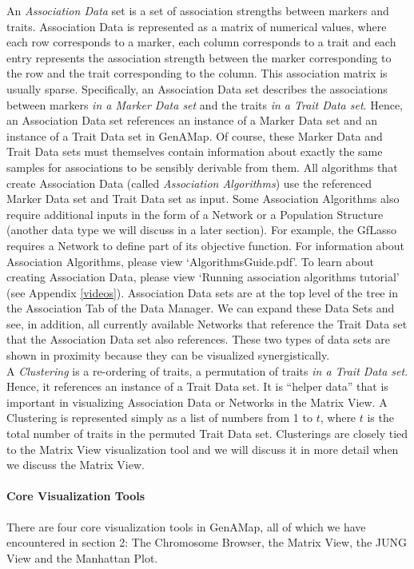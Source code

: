\documentclass{article}
\begin{document}
An {\it Association Data} set is a set of association strengths between markers and traits. Association Data is represented as a matrix of numerical values, where each row corresponds to a marker, each column corresponds to a trait and each entry represents the association strength between the marker corresponding to the row and the trait corresponding to the column. This association matrix is usually sparse. Specifically, an Association Data set describes the associations between markers {\it in a Marker Data set} and the traits {\it in a Trait Data set}. Hence, an Association Data set references an instance of a Marker Data set and an instance of a Trait Data set in GenAMap. Of course, these Marker Data and Trait Data sets must themselves contain information about exactly the same samples for associations to be sensibly derivable from them. All algorithms that create Association Data (called {\it Association Algorithms}) use the referenced Marker Data set and Trait Data set as input. Some Association Algorithms also require additional inputs in the form of a Network or a Population Structure (another data type we will discuss in a later section). For example, the GfLasso requires a Network to define part of its objective function. For information about Association Algorithms, please view `AlgorithmsGuide.pdf'. To learn about creating Association Data, please view `Running association algorithms tutorial' (see Appendix \ref{videos}). Association Data sets are at the top level of the tree in the Association Tab of the Data Manager. We can expand these Data Sets and see, in addition, all currently available Networks that reference the Trait Data set that the Association Data set also references. These two types of data sets are shown in proximity because they can be visualized synergistically.\\

A {\it Clustering} is a re-ordering of traits, a permutation of traits {\it in a Trait Data set}. Hence, it references an instance of a Trait Data set. It is ``helper data'' that is important in visualizing Association Data or Networks in the Matrix View. A Clustering is represented simply as a list of numbers from 1 to $t$, where $t$ is the total number of traits in the permuted Trait Data set.  Clusterings are closely tied to the Matrix View visualization tool and we will discuss it in more detail when we discuss the Matrix View.

\paragraph{Core Visualization Tools} There are four core visualization tools in GenAMap, all of which we have encountered in section 2: The Chromosome Browser, the Matrix View, the JUNG View and the Manhattan Plot.\\
\end{document}
